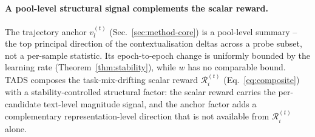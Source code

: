 \paragraph{A pool-level structural signal complements the scalar reward.}
The trajectory anchor $v_l^{(t)}$ (Sec.~\ref{sec:method-core}) is a
pool-level summary -- the top principal direction of the
contextualisation deltas across a probe subset, not a per-sample
statistic. Its epoch-to-epoch change is uniformly bounded by the
learning rate (Theorem~\ref{thm:stability}), while $w$ has no
comparable bound. \textsc{TADS} composes the task-mix-drifting
scalar reward $\mathcal{R}_i^{(t)}$ (Eq.~\ref{eq:composite}) with
a stability-controlled structural factor: the scalar reward carries
the per-candidate text-level magnitude signal, and the anchor
factor adds a complementary representation-level direction that is
not available from $\mathcal{R}_i^{(t)}$ alone.

